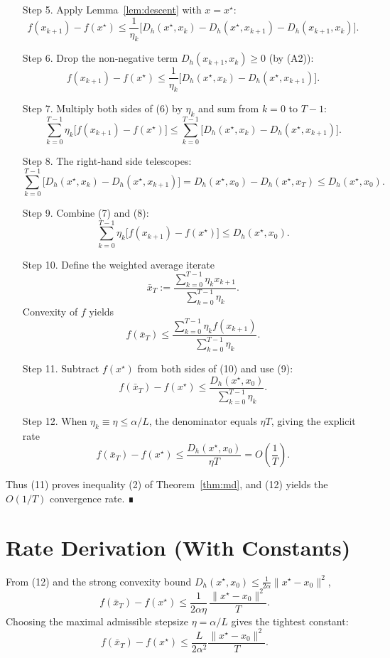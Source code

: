 \documentclass{article}
\newcommand{\Breg}{D_h}
\begin{document}
\begin{enumerate}
\item[Step 5.] Apply Lemma~\ref{lem:descent} with $x=x^\star$:
\[
f(x_{k+1})-f(x^\star)\le
\frac{1}{\eta_k}\bigl[\Breg(x^\star,x_k)-\Breg(x^\star,x_{k+1})-\Breg(x_{k+1},x_k)\bigr].
\tag{5}
\]

\item[Step 6.] Drop the non‑negative term $\Breg(x_{k+1},x_k)\ge0$ (by (A2)):
\[
f(x_{k+1})-f(x^\star)\le
\frac{1}{\eta_k}\bigl[\Breg(x^\star,x_k)-\Breg(x^\star,x_{k+1})\bigr].
\tag{6}
\]

\item[Step 7.] Multiply both sides of (6) by $\eta_k$ and sum from $k=0$ to $T-1$:
\[
\sum_{k=0}^{T-1}\eta_k\bigl[f(x_{k+1})-f(x^\star)\bigr]
\le
\sum_{k=0}^{T-1}\bigl[\Breg(x^\star,x_k)-\Breg(x^\star,x_{k+1})\bigr].
\tag{7}
\]

\item[Step 8.] The right‑hand side telescopes:
\[
\sum_{k=0}^{T-1}\bigl[\Breg(x^\star,x_k)-\Breg(x^\star,x_{k+1})\bigr]
= \Breg(x^\star,x_0)-\Breg(x^\star,x_T)\le \Breg(x^\star,x_0).
\tag{8}
\]

\item[Step 9.] Combine (7) and (8):
\[
\sum_{k=0}^{T-1}\eta_k\bigl[f(x_{k+1})-f(x^\star)\bigr]\le \Breg(x^\star,x_0).
\tag{9}
\]

\item[Step 10.] Define the weighted average iterate
\[
\bar x_T:=\frac{\sum_{k=0}^{T-1}\eta_k x_{k+1}}{\sum_{k=0}^{T-1}\eta_k}.
\]
Convexity of $f$ yields
\[
f(\bar x_T)\le\frac{\sum_{k=0}^{T-1}\eta_k f(x_{k+1})}{\sum_{k=0}^{T-1}\eta_k}.
\tag{10}
\]

\item[Step 11.] Subtract $f(x^\star)$ from both sides of (10) and use (9):
\[
f(\bar x_T)-f(x^\star)
\le
\frac{\Breg(x^\star,x_0)}{\sum_{k=0}^{T-1}\eta_k}.
\tag{11}
\]

\item[Step 12.] When $\eta_k\equiv\eta\le\alpha/L$, the denominator equals $\eta T$, giving the explicit rate
\[
f(\bar x_T)-f(x^\star)\le\frac{\Breg(x^\star,x_0)}{\eta T}=O\!\left(\frac{1}{T}\right).
\tag{12}
\]
\end{enumerate}

Thus (11) proves inequality (2) of Theorem~\ref{thm:md}, and (12) yields the $O(1/T)$ convergence rate. ∎

\section*{Rate Derivation (With Constants)}
From (12) and the strong convexity bound $\Breg(x^\star,x_0)\le\frac{1}{2\alpha}\|x^\star-x_0\|^{2}$,
\[
f(\bar x_T)-f(x^\star)\le \frac{1}{2\alpha\eta}\,\frac{\|x^\star-x_0\|^{2}}{T}.
\]
Choosing the maximal admissible stepsize $\eta=\alpha/L$ gives the tightest constant:
\[
f(\bar x_T)-f(x^\star)\le \frac{L}{2\alpha^{2}}\frac{\|x^\star-x_0\|^{2}}{T}.
\tag{13}
\]
\end{document}

